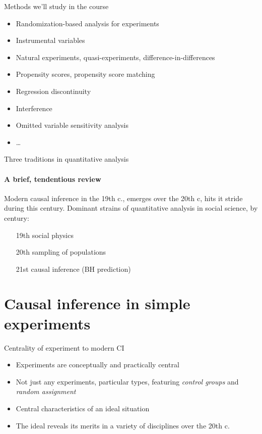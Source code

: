 \begin{frame}[label=whatWeWillCoverFr]{Methods we'll study in the course}
  \begin{itemize}
  \item Randomization-based analysis for experiments
  \item Instrumental variables
  \item Natural experiments, quasi-experiments,
    difference-in-differences
  \item Propensity scores, propensity score matching
  \item Regression discontinuity
  \item Interference
  \item Omitted variable sensitivity analysis
  \item \ldots
  \end{itemize}
\end{frame}


\begin{frame}{Three traditions in quantitative analysis}
\framesubtitle{A brief, tendentious review}

Modern causal inference in the 19th c., emerges over the 20th c, hits
it stride during this century. Dominant strains of quantitative
analysis in social science, by century:

\begin{itemize}
\item[19th] social physics
\item[20th] sampling of populations
\item[21st] causal inference (BH prediction)
\end{itemize}

  
\end{frame}

\section{Causal inference in simple experiments}

\begin{frame}{Centrality of experiment to modern CI}
  \begin{itemize}
  \item Experiments are conceptually and practically central
  \item Not just any experiments, particular types, featuring
    \textit{control groups} and \textit{random assignment}
  \item Central characteristics of an ideal situation
  \item The ideal reveals its merits in a variety of disciplines over
    the 20th c.  
  \end{itemize}
\end{frame}

